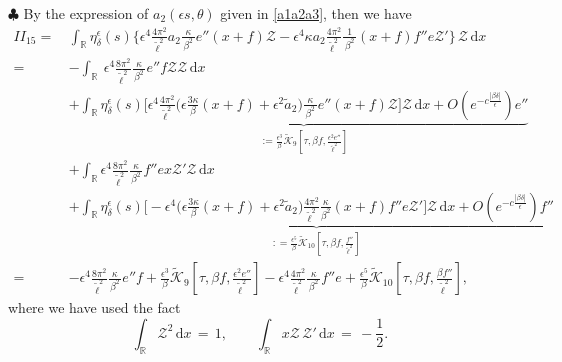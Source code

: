 \documentclass[10pt, reqno]{amsart}
\numberwithin{equation}{section}
\theoremstyle{definition}
\begin{document}
{\smallskip\noindent
$\clubsuit$
By the expression of $a_2(\epsilon s, \theta) $ given in \eqref{a1a2a3}, then we have
\begin{align} \label{second term of e intergral Z}
II_{15}
=\,& \int_{\mathbb R} \eta_\delta^\epsilon(s) \Bigg\{ \epsilon^4 \frac{4\pi^2} {{\tilde\ell}^2} a_2\frac{\kappa}{\, \beta^2\, } e'' (x+f)\mathcal Z -\epsilon^4 \kappa a_2 \frac{ 4\pi^2} {{\tilde\ell}^2} \frac{1}{\, \beta^2\, } (x+f) f'' e \mathcal Z'  \Bigg\} \,{\mathcal Z} \,{\mathrm d}x
\nonumber\\[2mm]
 =& -\int_{\mathbb R} \ \epsilon^4 \frac{8\pi^2} {{\tilde\ell}^2} \frac{\kappa}{\, \beta^2\, } e'' f\mathcal Z \mathcal Z \,{\mathrm d}x
\nonumber\\[2mm]
&+\underbrace{ \int_{\mathbb R} \eta_\delta^\epsilon(s) \Bigg[ \epsilon^4 \frac{4\pi^2} {{\tilde\ell}^2} \Big(\epsilon \frac{3\kappa}{\beta}(x+f) + \epsilon^2 {\tilde a}_2 \Big) \frac{\kappa}{\, \beta^2\, } e'' (x+f)\mathcal Z \Bigg] \mathcal Z \,{\mathrm d}x +O(e^{-c\frac{|\beta \delta|} \epsilon} )e''}_{:= \frac{\epsilon^3}{\beta}\tilde{\mathcal K}_9 \left[\tau, \beta f, \frac{\epsilon^2 e''}{\tilde \ell^2}\right]}
\nonumber\\[2mm]
&+\int_{\mathbb R}  \epsilon^4 \frac{ 8\pi^2} {{\tilde\ell}^2} \frac{\kappa }{\, \beta^2\, } f'' e x \mathcal Z'  \mathcal Z \,{\mathrm d}x
 \nonumber\\[2mm]
 &+ \underbrace{\int_{\mathbb R} \eta_\delta^\epsilon(s) \Bigg[ -\epsilon^4 \Big(\epsilon \frac{3\kappa}{\beta}(x+f) + \epsilon^2 {\tilde a}_2 \Big) \frac{ 4\pi^2} {{\tilde\ell}^2} \frac{\kappa }{ \beta^2} (x+f) f'' e \mathcal Z' \Bigg] \mathcal Z \,{\mathrm d}x + O(e^{-c\frac{|\beta \delta|} \epsilon} )f''}_{: = \frac{\epsilon^5}{\beta}\tilde{\mathcal K}_{10} \left[\tau, \beta f, \frac{f''}{\tilde \ell^2}\right]}
\nonumber\\[2mm]
 =&
- \epsilon^4 \frac{8\pi^2} {{\tilde\ell}^2} \frac{\kappa}{\, \beta^2\, } e'' f + \frac{\epsilon^3}{\beta}\tilde{\mathcal K}_9 \left[\tau, \beta f, \frac{\epsilon^2 e''}{\tilde \ell^2}\right]
- \epsilon^4\frac{4\pi^2} {{\tilde\ell}^2} \frac{\kappa }{\, \beta^2\, } f'' e+ \frac{\epsilon^5}{\beta}\tilde{\mathcal K}_{10} \left[\tau, \beta f, \frac{\beta f''}{\tilde \ell^2}\right],
\end{align}
where we have used the fact
\begin{equation*}
\int_{\mathbb R}{\mathcal Z}^2 \,{\mathrm d}x\,=\,1,
\qquad
\int_{\mathbb R} x{\mathcal Z}\,{\mathcal Z}'\,{\mathrm d}x\,=\,-\frac{1}{2}.
\end{equation*}




}
\end{document}
